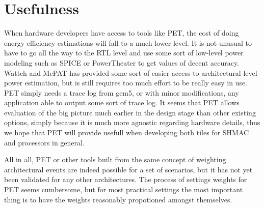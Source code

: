 \section{Usefulness}

When hardware developers have access to tools like PET, the cost of doing energy
efficiency estimations will fall to a much lower level. It is not unusual to
have to go all the way to the RTL level and use some sort of low-level power
modeling such as SPICE \cite{ponomarev2002accupower} or PowerTheater
\cite{bruno2005rtl} to get values of decent accuracy. Wattch and McPAT has
provided some sort of easier access to architectural level power estimation, but
is still requires too much effort to be really easy in use. PET simply needs a
trace log from gem5, or with minor modifications, any application able to output
some sort of trace log. It seems that PET allows evaluation of the big picture much
earlier in the design stage than other existing options, simply because it is much
more agnostic regarding hardware details, thus we hope that PET will provide usefull
when developing both tiles for SHMAC and processors in general.

All in all, PET or other tools built from the same concept of weighting architectural
events are indeed possible for a set of scenarios, but it has not yet been validated for
any other architectures. The process of settings weights for PET seems cumbersome, but
for most practical settings the most important thing is to have the weights reasonably
propotioned amongst themselves.
